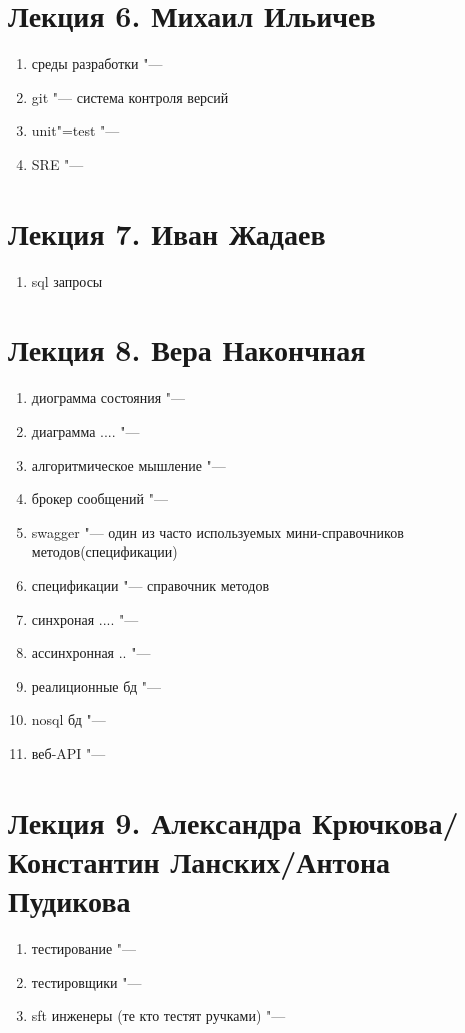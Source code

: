 \documentclass{article}
\begin{document}
\section{Лекция 6. Михаил Ильичев}
\begin{enumerate}
    \item среды разработки "--- 
    \item git "---  система контроля версий
    \item unit"=test "---  
    \item SRE "--- 
\end{enumerate}

\section{Лекция 7. Иван Жадаев}
\begin{enumerate}
    \item sql запросы
\end{enumerate}


\section{Лекция 8. Вера Накончная}
\begin{enumerate}
    \item диограмма состояния "---
    \item диаграмма .... "--- 
    \item алгоритмическое мышление "---
    \item брокер сообщений "---
    \item swagger "--- один из часто используемых мини-справочников методов(спецификации)
    \item спецификации "--- справочник методов
    \item синхроная .... "---
    \item ассинхронная .. "---
    \item реалиционные бд "---
    \item nosql бд "---
    \item веб-API "---
\end{enumerate}

\section{Лекция 9. Александра Крючкова/Константин Ланских/Антона Пудикова}
\begin{enumerate}
    \item тестирование "---
    \item тестировщики "---
    \item sft инженеры (те кто тестят ручками) "---
\end{enumerate}
\end{document}
